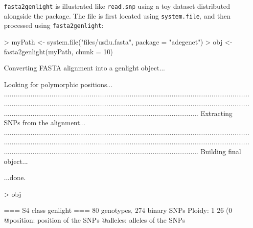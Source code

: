 \documentclass{article}
\begin{document}
\texttt{fasta2genlight} is illustrated like \texttt{read.snp} using a toy dataset distributed
alongside the package.
The file is first located using \texttt{system.file}, and then processed using \texttt{fasta2genlight}:
\begin{Schunk}
\begin{Sinput}
> myPath <- system.file("files/usflu.fasta", package = "adegenet")
> obj <- fasta2genlight(myPath, chunk = 10)
\end{Sinput}
\begin{Soutput}
 Converting FASTA alignment into a genlight object... 


 Looking for polymorphic positions... 
........................................................................................................................................................................................................................................................................................................................................................................
 Extracting SNPs from the alignment... 
........................................................................................................................................................................................................................................................................................................................................................................
 Building final object... 

...done.
\end{Soutput}
\begin{Sinput}
> obj
\end{Sinput}
\begin{Soutput}
 === S4 class genlight ===
 80 genotypes,  274 binary SNPs
 Ploidy: 1
 26 (0 %
 @position: position of the SNPs
 @alleles: alleles of the SNPs
\end{Soutput}
\end{Schunk}
\end{document}
